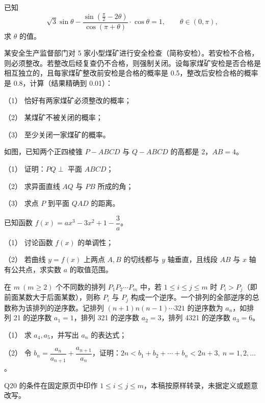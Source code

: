 \begin{question}
已知
\nopagebreak[4]
\[
\sqrt3\sin\theta-\frac{\sin\left(\frac{\pi}{2}-2\theta\right)}{\cos(\pi+\theta)}\cdot\cos\theta=1,\qquad \theta\in(0,\pi),
\]
求 $\theta$ 的值。

\end{question}
\begin{question}
某安全生产监督部门对 5 家小型煤矿进行安全检查（简称安检）。若安检不合格，则必须整改。若整改后经复查仍不合格，则强制关闭。设每家煤矿安检是否合格是相互独立的，且每家煤矿整改前安检是合格的概率是 0.5，整改后安检合格的概率是 0.8，计算（结果精确到 0.01）：

（1） 恰好有两家煤矿必须整改的概率；

（2） 某煤矿不被关闭的概率；

（3） 至少关闭一家煤矿的概率。

\Needspace{0.4\textheight}
\end{question}
\begin{question}
如图，已知两个正四棱锥 $P-ABCD$ 与 $Q-ABCD$ 的高都是 2，$AB=4$。

（1） 证明：$PQ\perp$ 平面 $ABCD$；

（2） 求异面直线 $AQ$ 与 $PB$ 所成的角；

（3） 求点 $P$ 到平面 $QAD$ 的距离。
\nopagebreak[4]
\begin{center}\end{center}
\nopagebreak[4]
\end{question}
\begin{question}
已知函数 $f(x)=ax^3-3x^2+1-\dfrac3a$。

（1） 讨论函数 $f(x)$ 的单调性；

（2） 若曲线 $y=f(x)$ 上两点 $A,B$ 的切线都与 $y$ 轴垂直，且线段 $AB$ 与 $x$ 轴有公共点，求实数 $a$ 的取值范围。

\end{question}
\begin{question}
在 $m\ (m\geqslant2)$ 个不同数的排列 $P_1P_2\cdots P_m$ 中，若 $1\leqslant i\leqslant j\leqslant m$ 时 $P_i>P_j$（即前面某数大于后面某数），则称 $P_i$ 与 $P_j$ 构成一个逆序。一个排列的全部逆序的总数称为该排列的逆序数。记排列 $(n+1)n(n-1)\cdots321$ 的逆序数为 $a_n$，如排列 21 的逆序数 $a_1=1$，排列 321 的逆序数 $a_2=3$，排列 4321 的逆序数 $a_3=6$。

（1） 求 $a_4,a_5$，并写出 $a_n$ 的表达式；

（2） 令 $b_n=\dfrac{a_n}{a_{n+1}}+\dfrac{a_{n+1}}{a_n}$，证明：$2n<b_1+b_2+\cdots+b_n<2n+3,\ n=1,2,\ldots$。

\begin{gktip}
Q20 的条件在固定原页中印作 $1\leqslant i\leqslant j\leqslant m$，本稿按原样转录，未据定义或题意改写。
\end{gktip}

\end{question}

